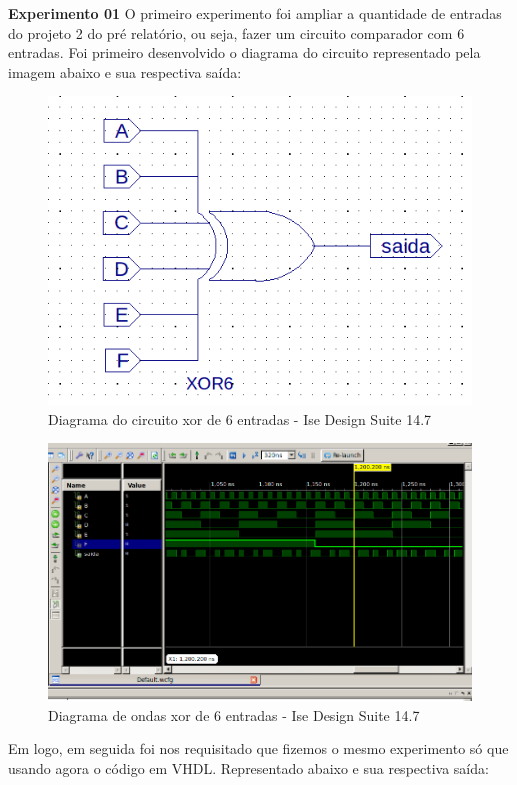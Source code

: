\documentclass[12pts]{article}
\begin{document}
\textbf{Experimento 01}
\singlespacing
	O primeiro experimento foi ampliar a quantidade de entradas do projeto 2 do pré relatório, ou seja, fazer um circuito comparador com 6 entradas. Foi primeiro desenvolvido o diagrama do circuito representado pela imagem abaixo e sua respectiva saída:

\begin{figure}[!htb]
  \centering
  \includegraphics[scale=0.6]{img/diagrama01}
  \caption{Diagrama do circuito xor de 6 entradas - Ise Design Suite 14.7}
  \label{figRotulo}
\end{figure}

\begin{figure}[!htb]
  \centering
  \includegraphics[scale=0.4]{img/saida01}
  \caption{Diagrama de ondas xor de 6 entradas - Ise Design Suite 14.7}
  \label{figRotulo}
\end{figure}
\newpage
Em logo, em seguida foi nos requisitado que fizemos o mesmo experimento só que usando agora o código em VHDL. Representado abaixo e sua respectiva saída:
\end{document}
